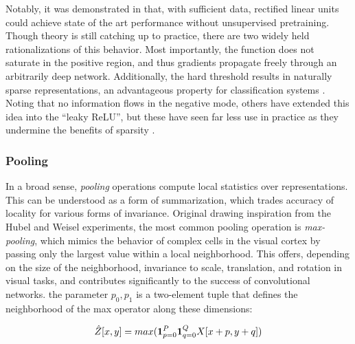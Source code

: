 \noindent Notably, it was demonstrated in \cite{Zeiler2013Rectified} that, with sufficient data, rectified linear units could achieve state of the art performance without unsupervised pretraining.
Though theory is still catching up to practice, there are two widely held rationalizations of this behavior.
Most importantly, the function does not saturate in the positive region, and thus gradients propagate freely through an arbitrarily deep network.
Additionally, the hard threshold results in naturally sparse representations, an advantageous property for classification systems \cite{Bengio2007Scaling}.
Noting that no information flows in the negative mode, others have extended this idea into the ``leaky ReLU'', but these have seen far less use in practice as they undermine the benefits of sparsity \cite{Maas2013Rectifier}.



\subsubsection{Pooling}


In a broad sense, \emph{pooling} operations compute local statistics over representations.
This can be understood as a form of summarization, which trades accuracy of locality for various forms of invariance.
Original drawing inspiration from the Hubel and Weisel experiments, the most common pooling operation is \emph{max-pooling}, which mimics the behavior of complex cells in the visual cortex by passing only the largest value within a local neighborhood.
This offers, depending on the size of the neighborhood, invariance to scale, translation, and rotation in visual tasks, and contributes significantly to the success of convolutional networks.
the parameter $p_0, p_1$ is a two-element tuple that defines the neighborhood of the max operator along these dimensions:


\begin{equation}
\label{eq:maxpool}
\small
\hat{Z}[x, y] = max (\mathbf{1}_{p=0}^{P} \mathbf{1}_{q=0}^{Q} X[x + p, y + q])
\end{equation}


